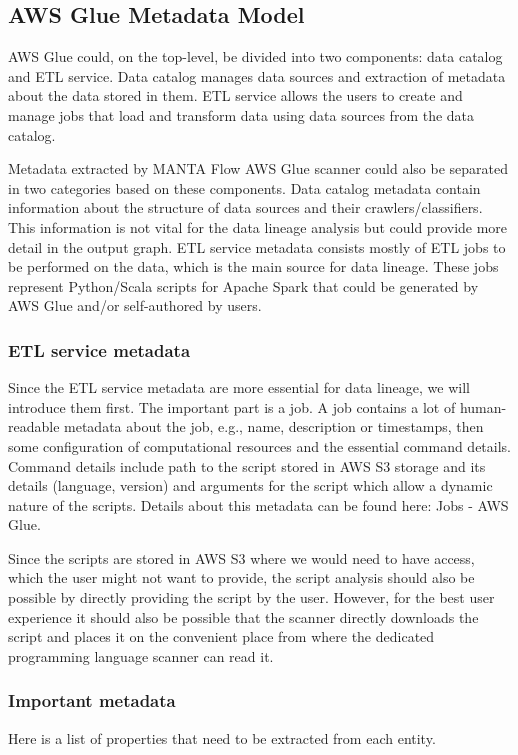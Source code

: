 \subsection{AWS Glue Metadata Model}

AWS Glue could, on the top-level, be divided into two components: data catalog and ETL service. Data catalog manages data sources and extraction of metadata about the data stored in them. ETL service allows the users to create and manage jobs that load and transform data using data sources from the data catalog. 

Metadata extracted by MANTA Flow AWS Glue scanner could also be separated in two categories based on these components. Data catalog metadata contain information about the structure of data sources and their crawlers/classifiers. This information is not vital for the data lineage analysis but could provide more detail in the output graph. ETL service metadata consists mostly of ETL jobs to be performed on the data, which is the main source for data lineage. These jobs represent Python/Scala scripts for Apache Spark that could be generated by AWS Glue and/or self-authored by users.

\subsubsection{ETL service metadata}
Since the ETL service metadata are more essential for data lineage, we will introduce them first. The important part is a job. A job contains a lot of human-readable metadata about the job, e.g., name, description or timestamps, then some configuration of computational resources and the essential command details. Command details include path to the script stored in AWS S3 storage and its details (language, version) and arguments for the script which allow a dynamic nature of the scripts. Details about this metadata can be found here: Jobs - AWS Glue.

Since the scripts are stored in AWS S3 where we would need to have access, which the user might not want to provide, the script analysis should also be possible by directly providing the script by the user. However, for the best user experience it should also be possible that the scanner directly downloads the script and places it on the convenient place from where the dedicated programming language scanner can read it.

\subsubsection{Important metadata}
Here is a list of properties that need to be extracted from each entity.


